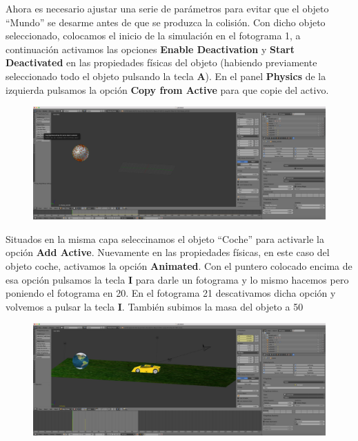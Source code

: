 \documentclass[10pt]{article}
\begin{document}
Ahora es necesario ajustar una serie de parámetros para evitar que el objeto ``Mundo'' se desarme antes de que se produzca la colisión.  Con dicho objeto seleccionado, colocamos el inicio de la simulación en el fotograma 1, a continuación activamos las opciones \textbf{Enable Deactivation} y \textbf{Start Deactivated} en las propiedades físicas del objeto (habiendo previamente seleccionado todo el objeto pulsando la tecla \textbf{A}). En el panel \textbf{Physics} de la izquierda pulsamos la opción \textbf{Copy from Active} para que copie del activo. \\

\begin{figure}[H]
	\begin{center}
	 		\includegraphics[width = 1.00\textwidth]{Imagenes/p5-img14}
	\end{center} 
\end{figure}

Situados en la misma capa seleccinamos el objeto ``Coche'' para activarle la opción \textbf{Add Active}. Nuevamente en las propiedades físicas, en este caso del objeto coche, activamos la opción \textbf{Animated}. Con el puntero colocado encima de esa opción pulsamos la tecla \textbf{I} para darle un fotograma y lo mismo hacemos pero poniendo el fotograma en 20. En el fotograma 21 descativamos dicha opción y volvemos a pulsar la tecla \textbf{I}. También subimos la masa del objeto a 50\\

\begin{figure}[H]
	\begin{center}
	 		\includegraphics[width = 1.00\textwidth]{Imagenes/p5-img15}
	\end{center} 
\end{figure}
\end{document}
